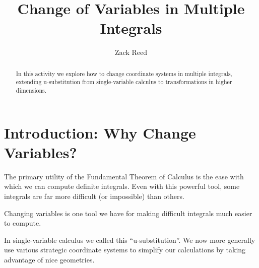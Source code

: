 \documentclass{ximera}
\title{Change of Variables in Multiple Integrals}
\author{Zack Reed}
\begin{document}
\begin{abstract}
In this activity we explore how to change coordinate systems in multiple integrals, extending u-substitution from single-variable calculus to transformations in higher dimensions.
\end{abstract}
\maketitle

\section*{Introduction: Why Change Variables?}

The primary utility of the Fundamental Theorem of Calculus is the ease with which we can compute definite integrals. Even with this powerful tool, some integrals are far more difficult (or impossible) than others.

Changing variables is one tool we have for making difficult integrals much easier to compute.

In single-variable calculus we called this ``u-substitution''. We now more generally use various strategic coordinate systems to simplify our calculations by taking advantage of nice geometries.
\end{document}
